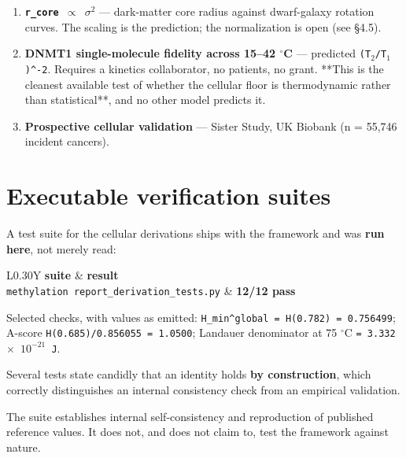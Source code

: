 \documentclass[12pt,a4paper]{article}
\begin{document}
\begin{enumerate}
  \item \textbf{\texttt{r\_core $\propto$ $\sigma^{2}$}} --- dark-matter core radius against dwarf-galaxy rotation curves. The scaling is the prediction; the normalization is open (see \S4.5).
  \item \textbf{DNMT1 single-molecule fidelity across 15--42 $^{\circ}$C} --- predicted \texttt{(T$_{2}$/T$_{1}$)\textasciicircum{}-2}. Requires a kinetics collaborator, no patients, no grant. **This is the cleanest available test of whether the cellular floor is thermodynamic rather than statistical**, and no other model predicts it.
  \item \textbf{Prospective cellular validation} --- Sister Study, UK Biobank (n = 55,746 incident cancers).
\end{enumerate}







\section{Executable verification suites}

A test suite for the cellular derivations ships with the framework and was \textbf{run here}, not merely read:


\begin{small}
\begin{tabularx}{\linewidth}{L{0.30\linewidth}Y}
\toprule
\textbf{suite} & \textbf{result} \\
\midrule
\texttt{methylation report\_\allowbreak{}derivation\_\allowbreak{}tests.py} & \textbf{12/12 pass} \\
\bottomrule
\end{tabularx}
\end{small}


Selected checks, with values as emitted: \texttt{H\_min\textasciicircum{}global = H(0.782) = 0.756499}; A-score \texttt{H(0.685)/0.856055 = 1.0500}; Landauer denominator at 75 $^{\circ}$C \texttt{= 3.332 $\times$ $10^{-21}$ J}.


Several tests state candidly that an identity holds \textbf{by construction}, which correctly distinguishes an internal consistency check from an empirical validation.


The suite establishes internal self-consistency and reproduction of published reference values. It does not, and does not claim to, test the framework against nature.
\end{document}
